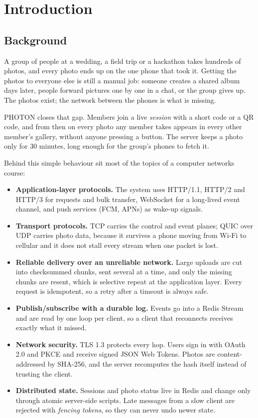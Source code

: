 \section{Introduction}\label{sec:intro}

\subsection{Background}

A group of people at a wedding, a field trip or a hackathon takes hundreds of photos, and every photo ends up on the one phone that took it. Getting the photos to everyone else is still a manual job: someone creates a shared album days later, people forward pictures one by one in a chat, or the group gives up. The photos exist; the network between the phones is what is missing.

PHOTON closes that gap. Members join a live \emph{session} with a short code or a QR code, and from then on every photo any member takes appears in every other member's gallery, without anyone pressing a button. The server keeps a photo only for 30 minutes, long enough for the group's phones to fetch it.

Behind this simple behaviour sit most of the topics of a computer networks course:

\begin{itemize}
  \item \textbf{Application-layer protocols.} The system uses HTTP/1.1, HTTP/2 and HTTP/3 for requests and bulk transfer, WebSocket for a long-lived event channel, and push services (FCM, APNs) as wake-up signals.
  \item \textbf{Transport protocols.} TCP carries the control and event planes; QUIC over UDP carries photo data, because it survives a phone moving from Wi-Fi to cellular and it does not stall every stream when one packet is lost.
  \item \textbf{Reliable delivery over an unreliable network.} Large uploads are cut into checksummed chunks, sent several at a time, and only the missing chunks are resent, which is selective repeat at the application layer. Every request is idempotent, so a retry after a timeout is always safe.
  \item \textbf{Publish/subscribe with a durable log.} Events go into a Redis Stream and are read by one loop per client, so a client that reconnects receives exactly what it missed.
  \item \textbf{Network security.} TLS 1.3 protects every hop. Users sign in with OAuth 2.0 and PKCE and receive signed JSON Web Tokens. Photos are content-addressed by SHA-256, and the server recomputes the hash itself instead of trusting the client.
  \item \textbf{Distributed state.} Sessions and photo status live in Redis and change only through atomic server-side scripts. Late messages from a slow client are rejected with \emph{fencing tokens}, so they can never undo newer state.
\end{itemize}

